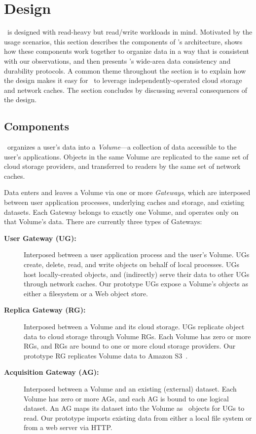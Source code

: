\section{Design}
\label{sec:design}

\Syndicate\ is designed with read-heavy but read/write workloads in mind. Motivated by the usage scenarios, this section describes the components of \Syndicate's architecture, shows how these components work together to organize data in a way that is consistent with our observations, and then presents \Syndicate's wide-area data consistency and durability protocols. A common theme throughout the section is to explain how the design makes it easy for \Syndicate\ to leverage independently-operated cloud storage and network caches. The section concludes by discussing several consequences of the design.

\subsection{Components}

\Syndicate\ organizes a user's data into a \textit{Volume}---a collection of data accessible to the user's applications. Objects in the same Volume are replicated to the same set of cloud storage providers, and transferred to readers by the same set of network caches.

Data enters and leaves a Volume via one or more \textit{Gateways}, which are interposed between user application processes, underlying caches and storage, and existing datasets. Each Gateway belongs to exactly one Volume, and operates only on that Volume's data. There are currently three types of Gateways:

\begin{description}

\item[\bf User Gateway (UG):] Interposed between a user application process and the user's Volume. UGs create, delete, read, and write objects on behalf of local processes. UGs host locally-created objects, and (indirectly) serve their data to other UGs through network caches. Our prototype UGs expose a Volume's objects as either a filesystem or a Web object store.

\item[\bf Replica Gateway (RG):] Interposed between a Volume and its cloud storage. UGs replicate object data to cloud storage through Volume RGs. Each Volume has zero or more RGs, and RGs are bound to one or more cloud storage providers. Our prototype RG replicates Volume data to Amazon S3~\cite{S3}.

\item[\bf Acquisition Gateway (AG):] Interposed between a Volume and an existing (external) dataset. Each Volume has zero or more AGs, and each AG is bound to one logical dataset. An AG maps its dataset into the Volume as \Syndicate\ objects for UGs to read. Our prototype imports existing data from either a local file system or from a web server via HTTP.

\end{description}

